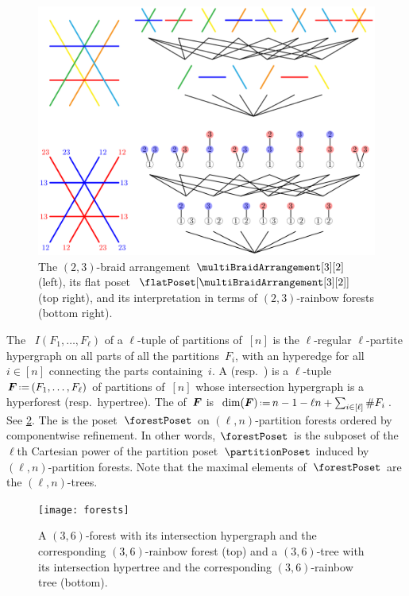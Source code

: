 \begin{figure}
	\centerline{\includegraphics[scale=.9]{figures/intersectionPosetMultiBraidArrangement32Full}}
	\caption{The $(2,3)$-braid arrangement $\multiBraidArrangement[3][2]$ (left), its flat poset~$\flatPoset[{\multiBraidArrangement[3][2]}]$ (top right), and its interpretation in terms of $(2,3)$-rainbow forests (bottom right).}
	\label{fig:MultiBraidArrangement32}
\end{figure}


\begin{definition}
The ~$I(F_1, \dots, F_\ell)$ of a $\ell$-tuple of partitions of~$[n]$ is the $\ell$-regular $\ell$-partite hypergraph on all parts of all the partitions~$F_i$, with an hyperedge for all~$i \in [n]$ connecting the parts containing~$i$.
A  (resp.~) is a $\ell$-tuple~$\b{F} \eqdef (F_1, \dots, F_\ell)$ of partitions of~$[n]$ whose intersection hypergraph is a hyperforest (resp.~hypertree).
The  of~$\boldsymbol{F}$ is~$\dim(\b{F}) \eqdef n - 1 - \ell n + \sum_{i \in [\ell]} \#F_i$.
See \cref{fig:forests}.
The  is the poset~$\forestPoset$ on $(\ell,n)$-partition forests ordered by componentwise refinement.
In other words, $\forestPoset$ is the subposet of the $\ell$th Cartesian power of the partition poset~$\partitionPoset$ induced by $(\ell,n)$-partition forests.
Note that the maximal elements of~$\forestPoset$ are the $(\ell, n)$-trees.
%
\begin{figure}
	\centerline{\texttt{[image: forests]}}
	\caption{A $(3,6)$-forest with its intersection hypergraph and the corresponding $(3,6)$-rainbow forest (top) and a $(3,6)$-tree with its intersection hypertree and the corresponding $(3,6)$-rainbow tree (bottom).}
	\label{fig:forests}
\end{figure}
\end{definition}


